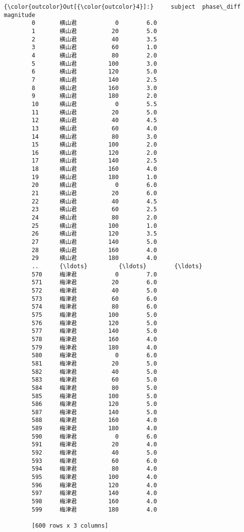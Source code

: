 \documentclass[11pt]{article}
\begin{document}
\begin{Verbatim}[commandchars=\\\{\}]
{\color{outcolor}Out[{\color{outcolor}4}]:}     subject  phase\_diff  magnitude
        0       横山君           0        6.0
        1       横山君          20        5.0
        2       横山君          40        3.5
        3       横山君          60        1.0
        4       横山君          80        2.0
        5       横山君         100        3.0
        6       横山君         120        5.0
        7       横山君         140        2.5
        8       横山君         160        3.0
        9       横山君         180        2.0
        10      横山君           0        5.5
        11      横山君          20        5.0
        12      横山君          40        4.5
        13      横山君          60        4.0
        14      横山君          80        3.0
        15      横山君         100        2.0
        16      横山君         120        2.0
        17      横山君         140        2.5
        18      横山君         160        4.0
        19      横山君         180        1.0
        20      横山君           0        6.0
        21      横山君          20        6.0
        22      横山君          40        4.5
        23      横山君          60        2.5
        24      横山君          80        2.0
        25      横山君         100        1.0
        26      横山君         120        3.5
        27      横山君         140        5.0
        28      横山君         160        4.0
        29      横山君         180        4.0
        ..      {\ldots}         {\ldots}        {\ldots}
        570     梅津君           0        7.0
        571     梅津君          20        6.0
        572     梅津君          40        5.0
        573     梅津君          60        6.0
        574     梅津君          80        6.0
        575     梅津君         100        5.0
        576     梅津君         120        5.0
        577     梅津君         140        5.0
        578     梅津君         160        4.0
        579     梅津君         180        4.0
        580     梅津君           0        6.0
        581     梅津君          20        5.0
        582     梅津君          40        5.0
        583     梅津君          60        5.0
        584     梅津君          80        5.0
        585     梅津君         100        5.0
        586     梅津君         120        5.0
        587     梅津君         140        5.0
        588     梅津君         160        4.0
        589     梅津君         180        4.0
        590     梅津君           0        6.0
        591     梅津君          20        4.0
        592     梅津君          40        5.0
        593     梅津君          60        6.0
        594     梅津君          80        4.0
        595     梅津君         100        4.0
        596     梅津君         120        4.0
        597     梅津君         140        4.0
        598     梅津君         160        4.0
        599     梅津君         180        4.0
        
        [600 rows x 3 columns]
\end{Verbatim}
            
\end{document}
